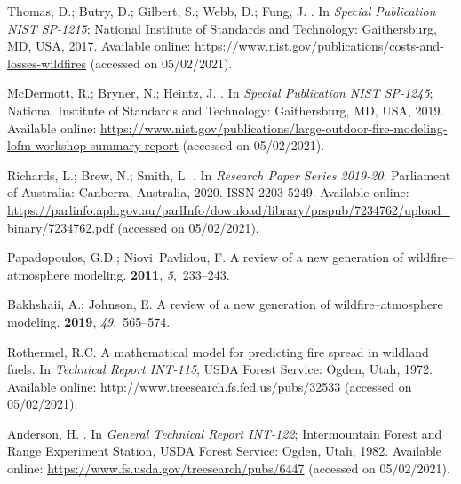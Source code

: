 \documentclass[atmosphere,article,accept,moreauthors,pdftex]{Definitions/mdpi}
\begin{document}
\begin{thebibliography}{999}

Thomas, D.; Butry, D.; Gilbert, S.; Webb, D.; Fung, J.
.
\newblock In \emph{Special Publication NIST SP-1215}; National Institute of Standards
  and Technology: Gaithersburg, MD, USA,  2017.
\newblock
   {Available online: \url{https://www.nist.gov/publications/costs-and-losses-wildfires} (accessed on 05/02/2021).}

McDermott, R.; Bryner, N.; Heintz, J.
.
\newblock In \emph{Special Publication NIST SP-1245}; National Institute of Standards
  and Technology: Gaithersburg, MD, USA,  2019.
\newblock
    Available online: \url{https://www.nist.gov/publications/large-outdoor-fire-modeling-lofm-workshop-summary-report} (accessed on 05/02/2021).

Richards, L.; Brew, N.; Smith, L.
.
\newblock In \emph{Research Paper Series 2019-20}; Parliament of
  Australia: Canberra, Australia,  2020. ISSN 2203-5249. 
\newblock
   {Available online: \url{https://parlinfo.aph.gov.au/parlInfo/download/library/prspub/7234762/upload\_binary/7234762.pdf} (accessed on 05/02/2021).} 

Papadopoulos, G.D.; Niovi~Pavlidou, F.
\newblock A review of a new generation of wildfire–atmosphere modeling.
 {\bf 2011}, {\em 5},~233--243.

Bakhshaii, A.; Johnson, E.
\newblock A review of a new generation of wildfire–atmosphere modeling.
 {\bf 2019}, {\em
  49},~565--574.

Rothermel, R.C.
\newblock A mathematical model for predicting fire spread in wildland fuels.
\newblock In \emph{Technical Report INT-115}; USDA Forest Service: Ogden, Utah,  1972.
\newblock
   {Available online: \url{http://www.treesearch.fs.fed.us/pubs/32533} (accessed on 05/02/2021).} 

Anderson, H.
.
\newblock In \emph{General Technical Report INT-122}; Intermountain Forest and Range
  Experiment Station, USDA Forest Service: Ogden, Utah,  1982.
\newblock
   {Available online: \url{https://www.fs.usda.gov/treesearch/pubs/6447} (accessed on 05/02/2021).} 


\end{thebibliography}
\end{document}
